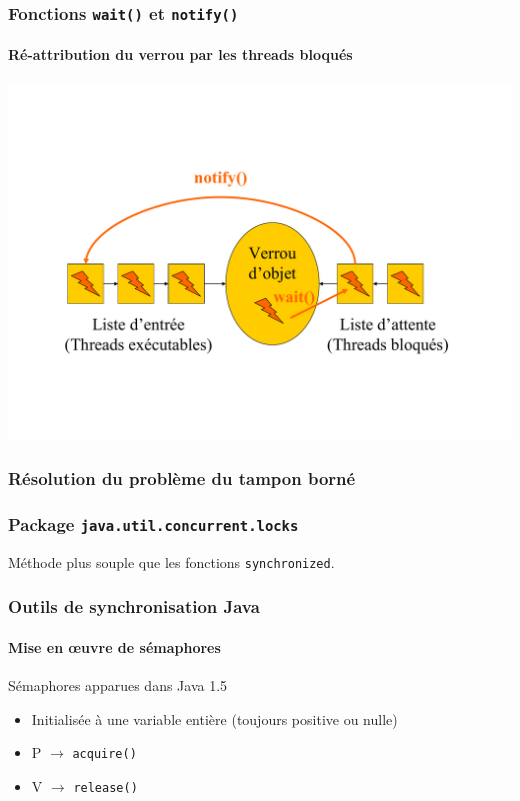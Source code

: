 \begin{frame}
\frametitle{Fonctions \texttt{wait()} et \texttt{notify()}}
\framesubtitle{Ré-attribution du verrou par les threads bloqués}
\includegraphics[width=.9\textwidth]{../illustration/methode_synchronized_notif.pdf}
\end{frame}

\begin{frame}
\frametitle{Résolution du problème du tampon borné}
\begin{scriptsize}\end{scriptsize}
\end{frame}

\begin{frame}
\frametitle{Package \texttt{java.util.concurrent.locks}}
\begin{scriptsize}

\end{scriptsize}
Méthode plus souple que les fonctions \texttt{synchronized}.
\end{frame}

\begin{frame}
\frametitle{Outils de synchronisation Java}
\framesubtitle{Mise en œuvre de sémaphores}
Sémaphores apparues dans Java 1.5
\begin{itemize}
\item Initialisée à une variable entière (toujours positive ou nulle)
\item P $\rightarrow$ \texttt{acquire()}
\item V $\rightarrow$ \texttt{release()}
\end{itemize}
\begin{scriptsize}

\end{scriptsize}
\end{frame}

